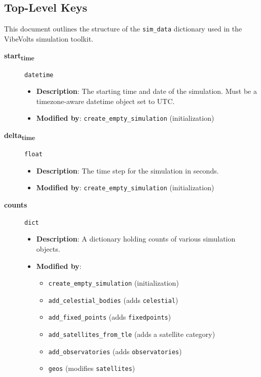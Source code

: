 \documentclass[11pt]{article}
\begin{document}
\subsection{Top-Level Keys}
\label{sec:org1624eac}
This document outlines the structure of the \texttt{sim\_data} dictionary used in the VibeVolts simulation toolkit.

\begin{description}
\item[{\textbf{start\textsubscript{time}}}] \texttt{datetime}
\begin{itemize}
\item \textbf{Description}: The starting time and date of the simulation. Must be a timezone-aware datetime object set to UTC.
\item \textbf{Modified by}: \texttt{create\_empty\_simulation} (initialization)
\end{itemize}

\item[{\textbf{delta\textsubscript{time}}}] \texttt{float}
\begin{itemize}
\item \textbf{Description}: The time step for the simulation in seconds.
\item \textbf{Modified by}: \texttt{create\_empty\_simulation} (initialization)
\end{itemize}

\item[{\textbf{counts}}] \texttt{dict}
\begin{itemize}
\item \textbf{Description}: A dictionary holding counts of various simulation objects.
\item \textbf{Modified by}:
\begin{itemize}
\item \texttt{create\_empty\_simulation} (initialization)
\item \texttt{add\_celestial\_bodies} (adds \texttt{celestial})
\item \texttt{add\_fixed\_points} (adds \texttt{fixedpoints})
\item \texttt{add\_satellites\_from\_tle} (adds a satellite category)
\item \texttt{add\_observatories} (adds \texttt{observatories})
\item \texttt{geos} (modifies \texttt{satellites})
\end{itemize}
\end{itemize}


\end{description}
\end{document}
